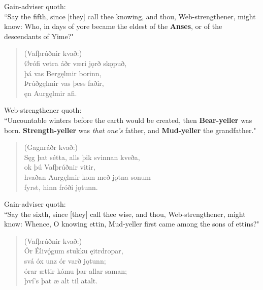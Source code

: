 \bvb Gain-adviser quoth: \\ “Say the fifth, since [they] call thee knowing, and thou, Web-strengthener, might know: Who, in days of yore became the eldest of the \textbf{Anses}, or of the descendants of Yime?" \\

\begin{verse}
(Vafþrúðnir kvað:) \\%
\bva Ørófi vetra \hld áðr væri jǫrð skǫpuð, \\%
\ind þá vas Bergęlmir borinn, \\%
Þrúðgęlmir \hld vas þess faðir, \\%
\ind ęn Aurgęlmir afi.\\%
\end{verse}

\bvb Web-strengthener quoth: \\ “Uncountable winters before the earth would be created, then \textbf{Bear-yeller} was born. \textbf{Strength-yeller} was \emph{that one's} father, and \textbf{Mud-yeller} the grandfather." \\

\begin{verse}
(Gagnráðr kvað:) \\%
\bva Sęg þat sétta, \hld alls þik svinnan kveða, \\%
\ind ok þú Vafþrúðnir vitir, \\%
hvaðan Aurgęlmir kom \hld með jǫtna sonum \\%
\ind fyrst, hinn fróði jǫtunn.\\%
\end{verse}

\bvb Gain-adviser quoth: \\ “Say the sixth, since [they] call thee wise, and thou, Web-strengthener, might know: Whence, O knowing ettin, Mud-yeller first came among the sons of ettins?" \\

\begin{verse}
(Vafþrúðnir kvað:) \\%
\bva Ór Élivǫ́gum \hld stukku ęitrdropar, \\%
\ind svá óx unz ór varð jǫtunn; \\%
órar ættir \hld kómu þar allar saman; \\%
\ind því's þat æ alt til atalt.\footnotemark[20]\\%
\end{verse}

